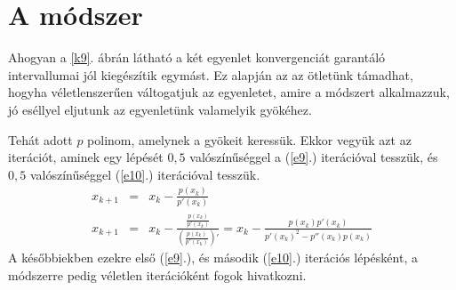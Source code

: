 \documentclass[a4paper,12pt]{report}
\begin{document}
		\section{A módszer}
            
			Ahogyan a \ref{k9}. ábrán látható a két egyenlet konvergenciát garantáló intervallumai jól kiegészítik egymást. Ez alapján az az ötletünk támadhat, hogyha véletlenszerűen váltogatjuk az egyenletet, amire a módszert alkalmazzuk, jó eséllyel eljutunk az egyenletünk valamelyik gyökéhez.

			Tehát adott $p$ polinom, amelynek a gyökeit keressük. Ekkor vegyük azt az iterációt, aminek egy lépését $0,\!5$ valószínűséggel a (\ref{e9}.) iterációval tesszük, és $0,\!5$ valószínűséggel (\ref{e10}.) iterációval tesszük. 
			\begin{eqnarray}
				\label{e9}x_{k+1}&=&x_k- \frac{p(x_k)}{p'(x_k)}\\
				\label{e10}x_{k+1}&=&x_k-\frac{\frac{p(x_k)}{p'(x_k)}}{\left(\frac{p(x_k)}{p'(x_k)}\right)'}=x_k-\frac{p(x_k)p'(x_k)}{p'(x_k)^2-p''(x_k)p(x_k)}
			\end{eqnarray}
			A későbbiekben ezekre első (\ref{e9}.), és második (\ref{e10}.) iterációs lépésként, a módszerre pedig véletlen iterációként fogok hivatkozni.
			
\end{document}

